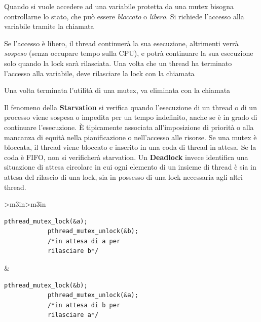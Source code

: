 \documentclass[10pt, letterpaper]{report}
\begin{document}
Quando si vuole accedere ad una variabile protetta da una mutex bisogna controllarne lo stato, che può 
essere \textit{bloccato} o \textit{libero}. Si richiede l'accesso alla variabile tramite la chiamata 
\begin{quote}
\end{quote} 
Se l'accesso è libero, il thread continuerà la sua esecuzione, altrimenti verrà \textit{sospeso} (senza 
occupare tempo sulla CPU), e potrà continuare la sua esecuzione solo quando la lock sarà rilasciata.\acc 
Una volta che un thread ha terminato l'accesso alla variabile, deve rilasciare la lock con la chiamata 
\begin{quote}
\end{quote} 
Una volta terminata l'utilità di una mutex, va eliminata con la chiamata \begin{quote}
\end{quote}
Il fenomeno della \textbf{Starvation} si verifica quando l'esecuzione di un thread o di un
 processo viene sospesa o impedita per un tempo indefinito, anche se è in grado di continuare 
 l'esecuzione. È tipicamente associata all'imposizione di priorità o alla mancanza di equità nella 
 pianificazione o nell'accesso alle risorse.
Se una mutex è bloccata, il thread viene bloccato e inserito in una coda di thread in attesa. Se la coda è FIFO, non si verificherà starvation.
\acc 
Un \textbf{Deadlock} invece identifica una situazione di attesa circolare in cui ogni elemento di un insieme 
di thread è sia in attesa del rilascio di una lock, sia in possesso di una lock necessaria agli altri thread. 
\begin{center}
	\begin{tabular}{>{\centering\arraybackslash}m{3in}>{\arraybackslash}m{3in}}
    \begin{lstlisting}[style=CStyle]
            pthread_mutex_lock(&a); 
            pthread_mutex_unlock(&b);
            /*in attesa di a per 
            rilasciare b*/
        \end{lstlisting}&
        \begin{lstlisting}[style=CStyle]
            pthread_mutex_lock(&b); 
            pthread_mutex_unlock(&a);
            /*in attesa di b per 
            rilasciare a*/
        \end{lstlisting}
	\end{tabular}
\end{center}
\end{document}
